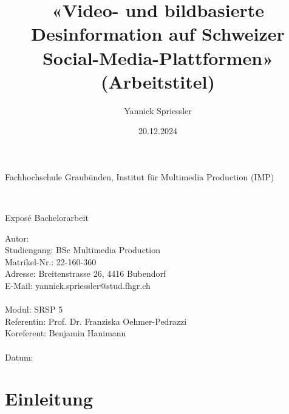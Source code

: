 \documentclass[12pt,a4paper]{article}        %
\title{«Video- und bildbasierte Desinformation auf Schweizer Social-Media-Plattformen» (Arbeitstitel)}        %
\author{Yannick Spriessler}     %
\date{20.12.2024}     %
\begin{document}
\begin{titlingpage} %
  \begin{center}
    \begin{large}
      Fachhochschule Graubünden, Institut für Multimedia Production (IMP)\\ %
    \end{large}
    \vspace{2cm} %
    \begin{LARGE}
      \textbf{\thetitle} \\
    \end{LARGE}
    \vspace{1cm}
    \begin{large}
      Exposé Bachelorarbeit\\
    \end{large}
    \vspace{5cm} %
    Autor: \theauthor \\
    Studiengang: BSc Multimedia Production \\
    Matrikel-Nr.: 22-160-360 \\
    Adresse: Breitenstrasse 26, 4416 Bubendorf \\
    E-Mail: yannick.spriessler@stud.fhgr.ch \\ \\
    Modul: SRSP 5 \\
    Referentin: Prof. Dr. Franziska Oehmer-Pedrazzi \\
    Koreferent: Benjamin Hanimann \\ \\
    Datum: \thedate
  \end{center}
\end{titlingpage}


\section{Einleitung}
\end{document}
